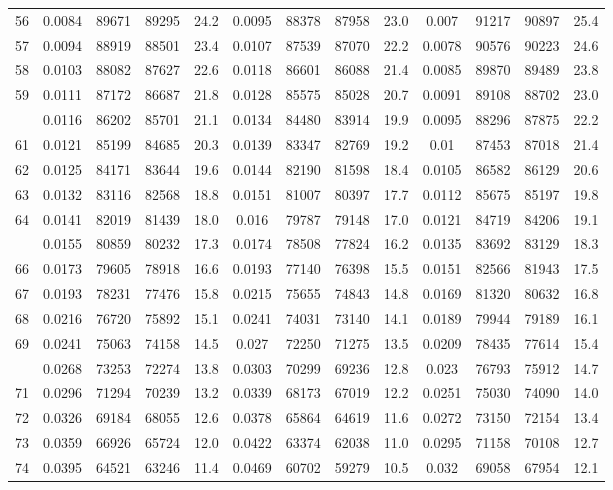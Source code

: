 \documentclass[
  14pt,
]{article}
\begin{document}
\begin{longtable}[t]{lcccccccccccc}
56 & 0.0084 & 89671 & 89295 & 24.2 & 0.0095 & 88378 & 87958 & 23.0 & 0.007 & 91217 & 90897 & 25.4\\
57 & 0.0094 & 88919 & 88501 & 23.4 & 0.0107 & 87539 & 87070 & 22.2 & 0.0078 & 90576 & 90223 & 24.6\\
58 & 0.0103 & 88082 & 87627 & 22.6 & 0.0118 & 86601 & 86088 & 21.4 & 0.0085 & 89870 & 89489 & 23.8\\
59 & 0.0111 & 87172 & 86687 & 21.8 & 0.0128 & 85575 & 85028 & 20.7 & 0.0091 & 89108 & 88702 & 23.0\\
\addlinespace
60 & 0.0116 & 86202 & 85701 & 21.1 & 0.0134 & 84480 & 83914 & 19.9 & 0.0095 & 88296 & 87875 & 22.2\\
61 & 0.0121 & 85199 & 84685 & 20.3 & 0.0139 & 83347 & 82769 & 19.2 & 0.01 & 87453 & 87018 & 21.4\\
62 & 0.0125 & 84171 & 83644 & 19.6 & 0.0144 & 82190 & 81598 & 18.4 & 0.0105 & 86582 & 86129 & 20.6\\
63 & 0.0132 & 83116 & 82568 & 18.8 & 0.0151 & 81007 & 80397 & 17.7 & 0.0112 & 85675 & 85197 & 19.8\\
64 & 0.0141 & 82019 & 81439 & 18.0 & 0.016 & 79787 & 79148 & 17.0 & 0.0121 & 84719 & 84206 & 19.1\\
\addlinespace
65 & 0.0155 & 80859 & 80232 & 17.3 & 0.0174 & 78508 & 77824 & 16.2 & 0.0135 & 83692 & 83129 & 18.3\\
66 & 0.0173 & 79605 & 78918 & 16.6 & 0.0193 & 77140 & 76398 & 15.5 & 0.0151 & 82566 & 81943 & 17.5\\
67 & 0.0193 & 78231 & 77476 & 15.8 & 0.0215 & 75655 & 74843 & 14.8 & 0.0169 & 81320 & 80632 & 16.8\\
68 & 0.0216 & 76720 & 75892 & 15.1 & 0.0241 & 74031 & 73140 & 14.1 & 0.0189 & 79944 & 79189 & 16.1\\
69 & 0.0241 & 75063 & 74158 & 14.5 & 0.027 & 72250 & 71275 & 13.5 & 0.0209 & 78435 & 77614 & 15.4\\
\addlinespace
70 & 0.0268 & 73253 & 72274 & 13.8 & 0.0303 & 70299 & 69236 & 12.8 & 0.023 & 76793 & 75912 & 14.7\\
71 & 0.0296 & 71294 & 70239 & 13.2 & 0.0339 & 68173 & 67019 & 12.2 & 0.0251 & 75030 & 74090 & 14.0\\
72 & 0.0326 & 69184 & 68055 & 12.6 & 0.0378 & 65864 & 64619 & 11.6 & 0.0272 & 73150 & 72154 & 13.4\\
73 & 0.0359 & 66926 & 65724 & 12.0 & 0.0422 & 63374 & 62038 & 11.0 & 0.0295 & 71158 & 70108 & 12.7\\
74 & 0.0395 & 64521 & 63246 & 11.4 & 0.0469 & 60702 & 59279 & 10.5 & 0.032 & 69058 & 67954 & 12.1\\

\end{longtable}
\end{document}
